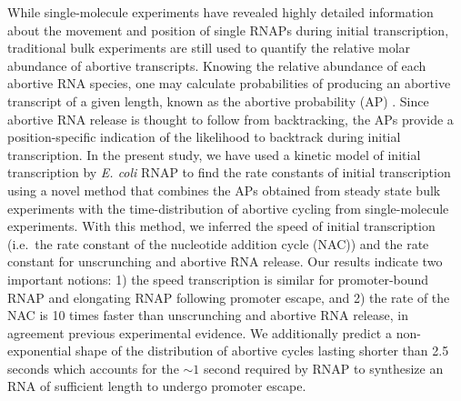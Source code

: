 While single-molecule experiments have revealed highly detailed information
about the movement and position of single RNAPs during initial transcription,
traditional bulk experiments are still used to quantify the relative molar
abundance of abortive transcripts. Knowing the relative abundance of each
abortive RNA species, one may calculate probabilities of producing an
abortive transcript of a given length, known as the abortive probability
(AP) \cite{hsu_promoter_2002, hsu_quantitative_1996}. Since abortive RNA
release is thought to follow from backtracking, the APs provide a
position-specific indication of the likelihood to backtrack during initial
transcription. In the present study, we have used a kinetic model of initial
transcription by \textit{E. coli} RNAP to find the rate constants of initial
transcription using a novel method that combines the APs obtained from steady
state bulk experiments with the time-distribution of abortive cycling from
single-molecule experiments. With this method, we inferred the speed of
initial transcription (i.e.\ the rate constant of the nucleotide addition
cycle (NAC)) and the rate constant for unscrunching and abortive RNA release.
Our results indicate two important notions: 1) the speed transcription is
similar for promoter-bound RNAP and elongating RNAP following promoter escape,
and 2) the rate of the NAC is 10 times faster than unscrunching and abortive
RNA release, in agreement previous experimental evidence. We additionally
predict a non-exponential shape of the distribution of abortive cycles lasting
shorter than 2.5 seconds which accounts for the $\sim1$ second required by
RNAP to synthesize an RNA of sufficient length to undergo promoter escape.
